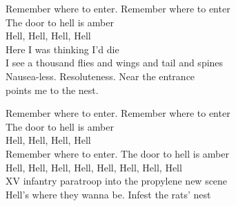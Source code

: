 Remember where to enter. Remember where to enter \\
The door to hell is amber \\

Hell, Hell, Hell, Hell \\

Here I was thinking I'd die \\
I see a thousand flies and wings and tail and spines \\
Nausea-less. Resoluteness. Near the entrance \\
 points me to the  nest.

Remember where to enter. Remember where to enter \\
The door to hell is amber \\

Hell, Hell, Hell, Hell \\

Remember where to enter. The door to hell is amber \\

Hell, Hell, Hell, Hell, Hell, Hell, Hell, Hell \\

XV infantry paratroop into the propylene new scene \\
Hell's where they wanna be. Infest the rats' nest \\
